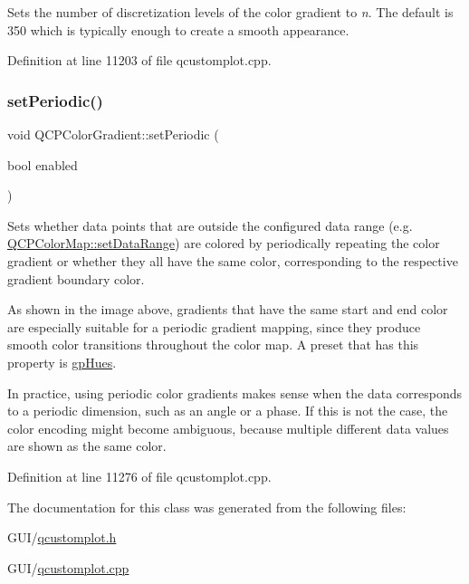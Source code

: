 Sets the number of discretization levels of the color gradient to {\itshape n}. The default is 350 which is typically enough to create a smooth appearance.

 

Definition at line 11203 of file qcustomplot.\+cpp.

\mbox{\label{class_q_c_p_color_gradient_a39d6448155fc00a219f239220d14bb39}} 
\subsubsection{\texorpdfstring{set\+Periodic()}{setPeriodic()}}
{\footnotesize\ttfamily void Q\+C\+P\+Color\+Gradient\+::set\+Periodic (\begin{DoxyParamCaption}\item[{bool}]{enabled }\end{DoxyParamCaption})}

Sets whether data points that are outside the configured data range (e.\+g. \hyperlink{class_q_c_p_color_map_a980b42837821159786a85b4b7dcb8774}{Q\+C\+P\+Color\+Map\+::set\+Data\+Range}) are colored by periodically repeating the color gradient or whether they all have the same color, corresponding to the respective gradient boundary color.



As shown in the image above, gradients that have the same start and end color are especially suitable for a periodic gradient mapping, since they produce smooth color transitions throughout the color map. A preset that has this property is \hyperlink{class_q_c_p_color_gradient_aed6569828fee337023670272910c9072a30efe58407acfb67939032f70213a130}{gp\+Hues}.

In practice, using periodic color gradients makes sense when the data corresponds to a periodic dimension, such as an angle or a phase. If this is not the case, the color encoding might become ambiguous, because multiple different data values are shown as the same color. 

Definition at line 11276 of file qcustomplot.\+cpp.



The documentation for this class was generated from the following files\+:\begin{DoxyCompactItemize}
\item 
G\+U\+I/\hyperlink{qcustomplot_8h}{qcustomplot.\+h}\item 
G\+U\+I/\hyperlink{qcustomplot_8cpp}{qcustomplot.\+cpp}\end{DoxyCompactItemize}
